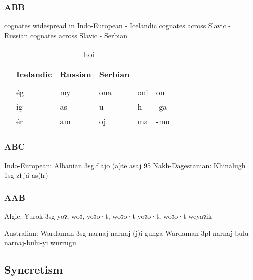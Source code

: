 \subsubsection{ABB}


cognates widespread in Indo-European - Icelandic
cognates across Slavic - Russian
cognates across Slavic - Serbian

\begin{table}[h]
  \center
	\caption {hoi}
	\begin{minipage}{0.8\linewidth}
		\begin{tabularx}{\textwidth}{c *{5}{Y}}
		\toprule
              & Icelandic & Russian   & Serbian     &              &              \\
		\midrule
              &  &  &  &   &   \\
    \midrule
     & ég        & my        &  ona        & oni          & on           \\
     & ig & as & u   & h   & -ga \\
     & ér & am & oj  & ma  & -mu \\
    \bottomrule
		\end{tabularx}
	\end{minipage}
\end{table}






\subsubsection{ABC}

Indo-European:
Albanian 3sg.f ajo (a)të asaj 95
Nakh-Dagestanian:
Khinalugh 1sg zɨ jä as(ɨr)


\subsubsection{AAB}

Algic:
Yurok 3sg yoɂ, woɂ, yoɂo·t, woɂo·t yoɂo·t, woɂo·t weyaɂik

Australian:
Wardaman 3sg narnaj narnaj-(j)i gunga
Wardaman 3pl narnaj-bulu narnaj-bulu-yi wurrugu

\subsection{Syncretism}




